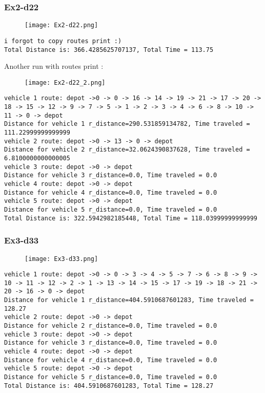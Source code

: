 \documentclass[letterpaper, 12pt]{article}
\begin{document}
\subsubsection{Ex2-d22}
\begin{figure}[htbp]
    \centering
    \texttt{[image: Ex2-d22.png]}
    
    
\end{figure}
\begin{lstlisting}
i forgot to copy routes print :)
Total Distance is: 366.4285625707137, Total Time = 113.75

\end{lstlisting}

Another run with routes print :
\begin{figure}[htbp]
    \centering
    \texttt{[image: Ex2-d22\_2.png]}
    
    
\end{figure}
\begin{lstlisting}
vehicle 1 route: depot ->0 -> 0 -> 16 -> 14 -> 19 -> 21 -> 17 -> 20 -> 18 -> 15 -> 12 -> 9 -> 7 -> 5 -> 1 -> 2 -> 3 -> 4 -> 6 -> 8 -> 10 -> 11 -> 0 -> depot
Distance for vehicle 1 r_distance=290.531859134782, Time traveled = 111.22999999999999
vehicle 2 route: depot ->0 -> 13 -> 0 -> depot
Distance for vehicle 2 r_distance=32.0624390837628, Time traveled = 6.8100000000000005
vehicle 3 route: depot ->0 -> depot
Distance for vehicle 3 r_distance=0.0, Time traveled = 0.0
vehicle 4 route: depot ->0 -> depot
Distance for vehicle 4 r_distance=0.0, Time traveled = 0.0
vehicle 5 route: depot ->0 -> depot
Distance for vehicle 5 r_distance=0.0, Time traveled = 0.0
Total Distance is: 322.5942982185448, Total Time = 118.03999999999999
\end{lstlisting}

\subsubsection{Ex3-d33}
\begin{figure}[htbp]
    \centering
    \texttt{[image: Ex3-d33.png]}
    
    
\end{figure}

\begin{lstlisting}
vehicle 1 route: depot ->0 -> 0 -> 3 -> 4 -> 5 -> 7 -> 6 -> 8 -> 9 -> 10 -> 11 -> 12 -> 2 -> 1 -> 13 -> 14 -> 15 -> 17 -> 19 -> 18 -> 21 -> 20 -> 16 -> 0 -> depot
Distance for vehicle 1 r_distance=404.5910687601283, Time traveled = 128.27
vehicle 2 route: depot ->0 -> depot
Distance for vehicle 2 r_distance=0.0, Time traveled = 0.0
vehicle 3 route: depot ->0 -> depot
Distance for vehicle 3 r_distance=0.0, Time traveled = 0.0
vehicle 4 route: depot ->0 -> depot
Distance for vehicle 4 r_distance=0.0, Time traveled = 0.0
vehicle 5 route: depot ->0 -> depot
Distance for vehicle 5 r_distance=0.0, Time traveled = 0.0
Total Distance is: 404.5910687601283, Total Time = 128.27
\end{lstlisting}
\end{document}
